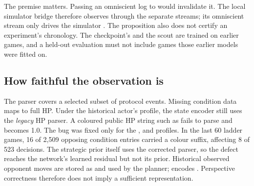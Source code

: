The premise matters. Passing an omniscient log to  would
invalidate it. The local simulator bridge therefore observes through the
separate  streams; its omniscient stream only
drives the simulator \citep{simprotocol,battlestream}. The proposition also
does not certify an experiment's chronology. The checkpoint's
 and the scout are trained on earlier games, and a
held-out evaluation must not include games those earlier models were fitted
on.


\subsection{How faithful the observation is}
The parser covers a selected subset of protocol events. Missing condition data
maps to full HP. Under the historical actor's  profile, the state
encoder still uses the \emph{legacy} HP parser. A coloured public HP string
such as  fails to parse and becomes 1.0. The bug was fixed only
for the ,  and  profiles. In
the last 60 ladder games, 16 of 2{,}509 opposing condition entries carried a
colour suffix, affecting 8 of 523 decisions. The strategic prior itself uses
the corrected parser, so the defect reaches the network's learned residual
but not its prior. Historical observed opponent moves are stored as
 and used by the planner;  encodes
. Perspective correctness therefore does not imply a sufficient
representation.

